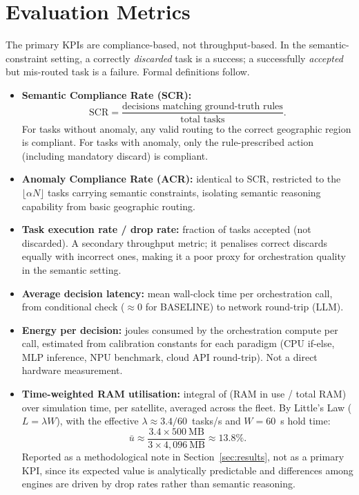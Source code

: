 \documentclass[conference,comsoc,twoside,caption=false]{IEEEtran}
\theoremstyle{definition}
\begin{document}
\section{Evaluation Metrics}
\label{sec:metrics}

The primary \acp{KPI} are compliance-based, not throughput-based. In the
semantic-constraint setting, a correctly \emph{discarded} task is a success; a
successfully \emph{accepted} but mis-routed task is a failure. Formal
definitions follow.

\begin{itemize}
  \item \textbf{Semantic Compliance Rate (SCR):}
    \begin{equation}
      \mathrm{SCR} = \frac{\text{decisions matching ground-truth rules}}
                          {\text{total tasks}}.
      \label{eq:scr}
    \end{equation}
    For tasks without anomaly, any valid routing to the correct geographic
    region is compliant. For tasks with anomaly, only the rule-prescribed
    action (including mandatory discard) is compliant.

  \item \textbf{Anomaly Compliance Rate (ACR):} identical to SCR, restricted
    to the $\lfloor \alpha N \rfloor$ tasks carrying semantic constraints,
    isolating semantic reasoning capability from basic geographic routing.

  \item \textbf{Task execution rate / drop rate:} fraction of tasks accepted
    (not discarded). A secondary throughput metric; it penalises correct
    discards equally with incorrect ones, making it a poor proxy for
    orchestration quality in the semantic setting.

  \item \textbf{Average decision latency:} mean wall-clock time per
    orchestration call, from conditional check ($\approx$0 for BASELINE) to
    network round-trip (LLM).

  \item \textbf{Energy per decision:} joules consumed by the orchestration
    compute per call, estimated from calibration constants for each paradigm
    (CPU if-else, MLP inference, NPU benchmark, cloud API round-trip). Not a
    direct hardware measurement.

  \item \textbf{Time-weighted RAM utilisation:} integral of
    (RAM in use / total RAM) over simulation time, per satellite, averaged
    across the fleet. By Little's Law ($L = \lambda W$), with the effective
    $\lambda \approx 3.4/60$~tasks/s and $W = 60$~s hold time:
    \begin{equation}
      \bar{u} \approx \frac{3.4 \times 500~\text{MB}}{3 \times 4{,}096~\text{MB}}
               \approx 13.8\%.
      \label{eq:ram}
    \end{equation}
    Reported as a methodological note in Section~\ref{sec:results}, not as a
    primary KPI, since its expected value is analytically predictable and
    differences among engines are driven by drop rates rather than semantic
    reasoning.
\end{itemize}
\end{document}
